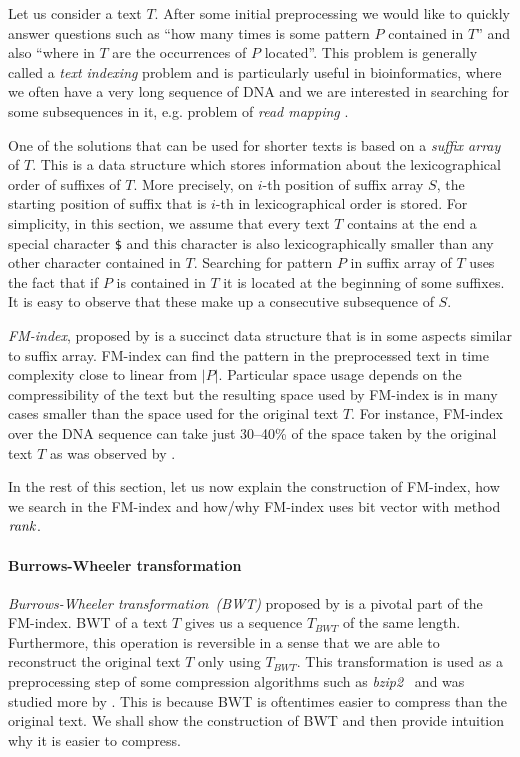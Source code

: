 Let us consider a text $T$. After some initial preprocessing we would like to quickly answer
questions such as ``how many times is some pattern $P$ contained in $T$'' and also ``where in $T$
are the occurrences of $P$ located''. This problem is generally called a \textit{text indexing}
problem and is particularly useful in bioinformatics, where we often have a very long sequence of DNA
and we are interested in searching for some subsequences in it, e.g. problem of \emph{read mapping}
\citep{simpson2010efficient}.

One of the solutions that can be used for shorter texts is based on a \textit{suffix array}
of $T$. This is a data structure which stores information about the lexicographical
order of suffixes of $T$. More precisely, on $i$-th position of suffix array $S$, the starting
position of suffix that is $i$-th in lexicographical order is stored. For simplicity, in this
section, we assume that every text $T$ contains at the end a special character {\tt \$} and this
character is also lexicographically smaller than any other character contained in $T$. Searching for
pattern $P$ in suffix array of $T$ uses the fact that if $P$ is contained in $T$ it is located at
the beginning of some suffixes. It is easy to observe that these make up a consecutive subsequence
of $S$.

\textit{FM-index}, proposed by \cite{ferragina2000opportunistic} is a succinct data structure that
is in some aspects similar to suffix array. FM-index can find the pattern in the preprocessed text
in time complexity close to linear from $|P|$. Particular space usage depends on the compressibility
of the text but the resulting space used by FM-index is in many cases smaller than the space used for
the original text $T$. For instance, FM-index over the DNA sequence can take just 30--40\% of the space
taken by the original text $T$ as was observed by \cite{ferragina2001experimental}.

In the rest of this section, let us now explain the construction of FM-index, how we search in the
FM-index and how/why FM-index uses bit vector with method $\mathit{rank}$.

\paragraph{Burrows-Wheeler transformation}

\textit{Burrows-Wheeler transformation~(BWT)} proposed by \cite{burrows1994block} is a pivotal
part of the FM-index. BWT of a text $T$ gives us a sequence $\mathit{T_{BWT}}$ of the same
length. Furthermore, this operation is reversible in a sense that we are able to reconstruct
the original text $T$ only using $\mathit{T_{BWT}}$. This transformation is used as a
preprocessing step of some compression algorithms such as \textit{bzip2}~\citep{seward1996bzip2}
and was studied more by \cite{manzini2001analysis}. This is because BWT is oftentimes easier
to compress than the original text. We shall show the construction of BWT and then provide
intuition why it is easier to compress.

